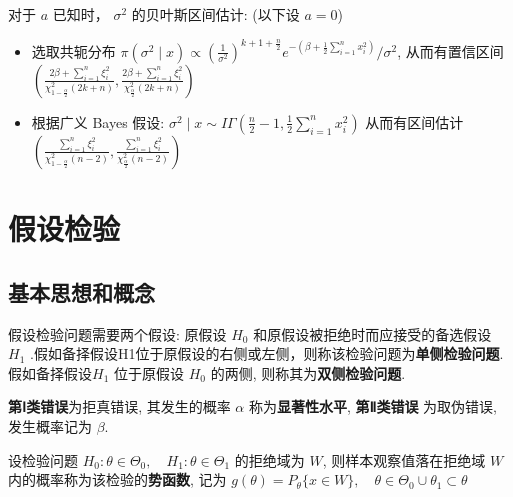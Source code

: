\documentclass[10pt]{yerbaformat}
\begin{document}
\par 对于 $a$ 已知时， $\sigma^{2}$ 的贝叶斯区间估计: (以下设 $a=0$)

\begin{itemize}
    \item 选取共轭分布 $\pi\left(\sigma^{2} \mid x\right) \propto \left(\frac{1}{\sigma^{2}}\right)^{k+1+\frac{n}{2}} e^{-\left(\beta+\frac{1}{2} \sum_{i=1}^{n} x_{i}^{2}\right)} / \sigma^{2}$, 从而有置信区间 $\left(\frac{2 \beta+\sum_{i=1}^{n} \xi_{i}^{2}}{\chi_{1-\frac{\alpha}{2}}^{2}(2 k+n)}, \frac{2 \beta+\sum_{i=1}^{n} \xi_{i}^{2}}{\chi_{\frac{\alpha}{2}}^{2}(2 k+n)}\right)$
    \item 根据广义 Bayes 假设: $\sigma^{2} \mid x \sim I \Gamma\left(\frac{n}{2}-1, \frac{1}{2} \sum_{i=1}^{n} x_{i}^{2}\right)$ 从而有区间估计 $\left(\frac{\sum_{i=1}^{n} \xi_{i}^{2}}{\chi_{1-\frac{\alpha}{2}}^{2}(n-2)}, \frac{\sum_{i=1}^{n} \xi_{i}^{2}}{\chi_{\frac{\alpha}{2}}^{2}(n-2)}\right)$
\end{itemize}

\section{假设检验}

\subsection{基本思想和概念}

\begin{definition}
    假设检验问题需要两个假设: 原假设 $H_0$ 和原假设被拒绝时而应接受的备选假设 $H_1$ .假如备择假设H1位于原假设的右侧或左侧，则称该检验问题为\textbf{单侧检验问题}. 假如备择假设$H_1$ 位于原假设 $H_0$ 的两侧, 则称其为\textbf{双侧检验问题}.
\end{definition}

\begin{definition}[错误类别]
    \textbf{第Ⅰ类错误}为拒真错误, 其发生的概率 $\alpha$ 称为\textbf{显著性水平}, \textbf{第Ⅱ类错误} 为取伪错误, 发生概率记为 $\beta$.
\end{definition}

\begin{definition}
    设检验问题 $H_{0}: \theta \in \Theta_{0}, \quad H_{1}: \theta \in \Theta_{1}$ 的拒绝域为 $W$, 则样本观察值落在拒绝域 $W$ 内的概率称为该检验的\textbf{势函数}, 记为 $g(\theta)=P_{\theta}\{x \in W\}, \quad \theta \in \Theta_{0} \cup \theta_{1} \subset \theta $
\end{definition}
\end{document}
